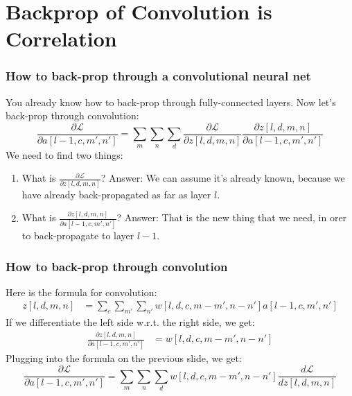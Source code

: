 \documentclass{beamer}
\begin{document}
\section[Backprop]{Backprop of Convolution is Correlation}
\setcounter{subsection}{1}

\begin{frame}
  \frametitle{How to back-prop through a convolutional neural net}

  You already know how to back-prop through fully-connected layers.  Now let's
  back-prop through convolution:
  \begin{displaymath}
    \frac{\partial{\mathcal L}}{\partial a[l-1,c,m',n']} =
    \sum_{m}\sum_n\sum_d\frac{\partial{\mathcal L}}{\partial z[l,d,m,n]}
    \frac{\partial z[l,d,m,n]}{\partial a[l-1,c,m',n']}
  \end{displaymath}
  We need to find two things:
  \begin{enumerate}
  \item What is $\frac{\partial{\mathcal L}}{\partial z[l,d,m,n]}$?
    Answer: We can assume it's already known, because we have already back-propagated as
    far as layer $l$.
  \item What is $\frac{\partial z[l,d,m,n]}{\partial a[l-1,c,m',n']}$?
    Answer: That is the new thing that we need, in orer to back-propagate to
    layer $l-1$.
  \end{enumerate}
\end{frame}

\begin{frame}
  \frametitle{How to back-prop through convolution}

  Here is the formula for convolution:
  \begin{align*}
    z[l,d,m,n] &= \sum_c\sum_{m'}\sum_{n'} w[l,d,c,m-m',n-n']a[l-1,c,m',n']
  \end{align*}
  If we differentiate the left side w.r.t. the right side, we get:
  \begin{align*}
    \frac{\partial z[l,d,m,n]}{\partial a[l-1,c,m',n']} &= w[l,d,c,m-m',n-n']
  \end{align*}
  Plugging into the formula on the previous slide, we get:
  \begin{displaymath}
    \frac{\partial{\mathcal L}}{\partial a[l-1,c,m',n']} =
    \sum_{m}\sum_n\sum_d w[l,d,c,m-m',n-n']\frac{d{\mathcal L}}{dz[l,d,m,n]}
  \end{displaymath}
\end{frame}
\end{document}
